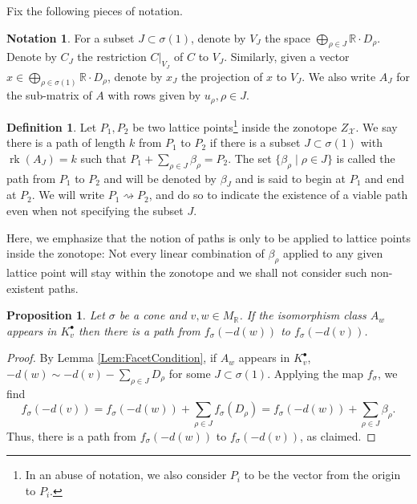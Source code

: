 \documentclass[reqno, 12pt]{amsart}
\newtheorem{proposition}[theorem]{Proposition}
\theoremstyle{definition}
\newtheorem{definition}[theorem]{Definition}
\newtheorem{notation}[theorem]{Notation}
\numberwithin{equation}{section}
\newcommand{\newterm}{\textsf}
\newcommand{\R}{\mathbb{R}}
\begin{document}
Fix the following pieces of notation.

\begin{notation}
    \label{Not:AJandCJ}
     For a subset $J\subset\sigma(1)$, denote by $V_J$ the space $\bigoplus_{\rho\in J}\R\cdot D_\rho$. Denote by $C_J$ the restriction $C\vert_{V_J}$ of $C$ to $V_J$. Similarly, given a vector $x\in \bigoplus_{\rho\in \sigma(1)}\R\cdot D_\rho$, denote by $x_J$ the projection of $x$ to $V_J$. 
     We also write $A_J$ for the sub-matrix of $A$ with rows given by $u_\rho, \rho\in J$.
\end{notation}

\begin{definition}
    \label{Def:PathInZonotope}
    Let $P_1, P_2$ be two lattice points\footnote{In an abuse of notation, we also consider $P_i$ to be the vector from the origin to $P_i$.} inside the zonotope $Z_\mathcal{X}$. We say there is a path of length $k$ from $P_1$ to $P_2$ if there is a subset $J\subset\sigma(1)$ with $\operatorname{rk}(A_J)=k$ such that $P_1+\sum_{\rho\in J} \beta_\rho=P_2$. The set $\{\beta_\rho\mid \rho\in J\}$ is called the \newterm{path from $P_1$ to $P_2$} and will be denoted by $\beta_J$ and is said to \newterm{begin} at $P_1$ and \newterm{end} at $P_2$. We will write $P_1\rightsquigarrow P_2$, and do so to indicate the existence of a viable path even when not specifying the subset $J$.
\end{definition}


Here, we emphasize that the notion of paths is only to be applied to lattice points inside the zonotope: Not every linear combination of $\beta_\rho$ applied to any given lattice point will stay within the zonotope and we shall not consider such non-existent paths. 

\begin{proposition}
    \label{Prop:CplxViaPaths1}
    Let $\sigma$ be a cone and $v,w\in M_\R$. If the isomorphism class $A_w$ appears in $K_v^\bullet$ then there is a path from $f_\sigma(-d(w))$ to $f_\sigma(-d(v))$.
\end{proposition}

\begin{proof}
    By Lemma \ref{Lem:FacetCondition}, if $A_w$ appears in $K_v^\bullet$, $-d(w)\sim -d(v)-\sum_{\rho\in J}D_\rho$ for some $J\subset \sigma(1)$. Applying the map $f_{\sigma}$, we find \[f_\sigma(-d(v))=f_\sigma(-d(w))+\sum_{\rho\in J} f_{\sigma}(D_\rho)=f_\sigma(-d(w))+\sum_{\rho\in J}\beta_\rho.\]
    Thus, there is a path from $f_\sigma(-d(w))$ to $f_\sigma(-d(v))$, as claimed. 

\end{proof}
\end{document}
